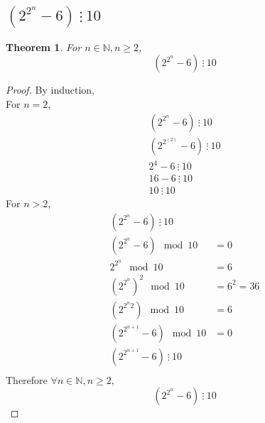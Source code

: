\documentclass[]{article}
\newcommand{\N}{\mathbb{N}}
\newcommand{\divisible}{ \ \vdots \ }
\newtheorem{theorem}{Theorem}
\begin{document}
\subsection{
    $(2^{2^n} - 6) \divisible 10$
}
\begin{theorem}
    For $n \in \N, n \geq 2$,
    $$(2^{2^n} - 6) \divisible 10$$
\end{theorem}
\begin{proof}
    By induction,\\
    For $n=2$,
    \begin{align*}
        (2^{2^n} - 6) \divisible 10\\
        (2^{2^(2)} - 6) \divisible 10\\
        2^4 - 6 \divisible 10\\
        16 - 6 \divisible 10\\
        10 \divisible 10
    \end{align*}
    For $n>2$,
    \begin{align*}
        (2^{2^n} - 6) \divisible 10&\\
        (2^{2^n} - 6) \mod 10 &= 0\\
        2^{2^n} \mod 10 &= 6\\
        (2^{2^n})^2 \mod 10 &= 6^2 = 36\\
        (2^{2^n 2}) \mod 10 &= 6\\
        (2^{2^{n+1}} - 6) \mod 10 &= 0\\
        (2^{2^{n+1}} - 6) \divisible 10&\\
    \end{align*}
    Therefore $\forall n \in \N, n \geq 2$,
    $$(2^{2^n} - 6) \divisible 10$$
\end{proof}

\newpage
\section{}

\end{document}
